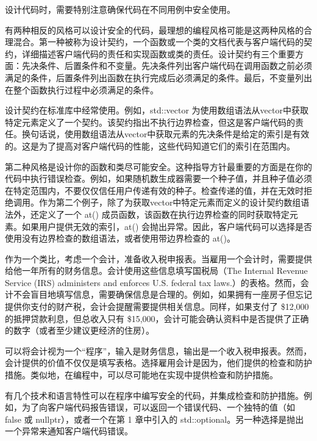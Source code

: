 
设计代码时，需要特别注意确保代码在不同用例中安全使用。

有两种相反的风格可以设计安全的代码，最理想的编程风格可能是这两种风格的合理混合。第一种被称为设计契约，一个函数或一个类的文档代表与客户端代码的契约，详细描述客户端代码的责任和实现函数或类的责任。设计契约有三个重要方面：先决条件、后置条件和不变量。先决条件列出客户端代码在调用函数之前必须满足的条件，后置条件列出函数在执行完成后必须满足的条件。最后，不变量列出在整个函数执行过程中必须满足的条件。

设计契约在标准库中经常使用。例如，std::vector 为使用数组语法从vector中获取特定元素定义了一个契约。该契约指出不执行边界检查，但这是客户端代码的责任。换句话说，使用数组语法从vector中获取元素的先决条件是给定的索引是有效的。这是为了提高对客户端代码的性能，这些代码知道它们的索引在范围内。

第二种风格是设计你的函数和类尽可能安全。这种指导方针最重要的方面是在你的代码中执行错误检查。例如，如果随机数生成器需要一个种子值，并且种子值必须在特定范围内，不要仅仅信任用户传递有效的种子。检查传递的值，并在无效时拒绝调用。作为第二个例子，除了为获取vector中特定元素而定义的设计契约数组语法外，还定义了一个 at() 成员函数，该函数在执行边界检查的同时获取特定元素。如果用户提供无效的索引，at() 会抛出异常。因此，客户端代码可以选择是否使用没有边界检查的数组语法，或者使用带边界检查的 at()。

作为一个类比，考虑一个会计，准备收入税申报表。当雇用一个会计时，需要提供给他一年所有的财务信息。会计使用这些信息填写国税局（The Internal Revenue Service (IRS) administers and enforces U.S. federal tax laws.）的表格。然而，会计不会盲目地填写信息，需要确保信息是合理的。例如，如果拥有一座房子但忘记提供你支付的财产税，会计会提醒需要提供相关信息。同样，如果支付了 \$12,000 的抵押贷款利息，但总收入只有 \$15,000，会计可能会确认资料中是否提供了正确的数字（或者至少建议更经济的住房）。

可以将会计视为一个“程序”，输入是财务信息，输出是一个收入税申报表。然而，会计提供的价值不仅仅是填写表格。选择雇用会计是因为，他们提供的检查和防护措施。类似地，在编程中，可以尽可能地在实现中提供检查和防护措施。

有几个技术和语言特性可以在程序中编写安全的代码，并集成检查和防护措施。例如，为了向客户端代码报告错误，可以返回一个错误代码、一个独特的值（如 false 或 nullptr），或者一个在第 1 章中引入的 std::optional。另一种选择是抛出一个异常来通知客户端代码错误。


